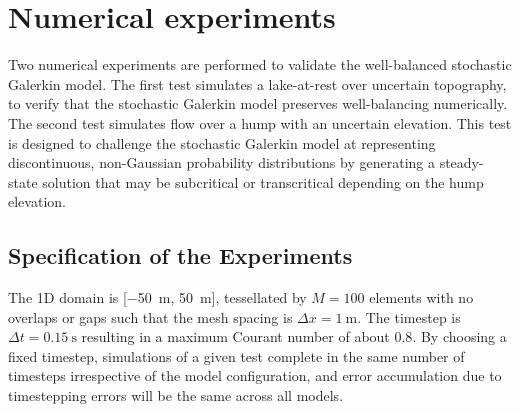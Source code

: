 \section{Numerical experiments}

Two numerical experiments are performed to validate the well-balanced stochastic Galerkin model.
The first test simulates a lake-at-rest over uncertain topography, to verify that the stochastic Galerkin model preserves well-balancing numerically.
The second test simulates flow over a hump with an uncertain elevation.
This test is designed to challenge the stochastic Galerkin model at representing discontinuous, non-Gaussian probability distributions by generating a steady-state solution that may be subcritical or transcritical depending on the hump elevation.

\subsection{Specification of the Experiments}
The 1D domain is [\SI{-50}{\meter}, \SI{50}{\meter}], tessellated by $M = 100$ elements with no overlaps or gaps such that the mesh spacing is $\Delta x = \SI{1}{\meter}$.
The timestep is $\Delta t = \SI{0.15}{\second}$ resulting in a maximum Courant number of about $0.8$.
By choosing a fixed timestep, simulations of a given test complete in the same number of timesteps irrespective of the model configuration, and error accumulation due to timestepping errors will be the same across all models.

